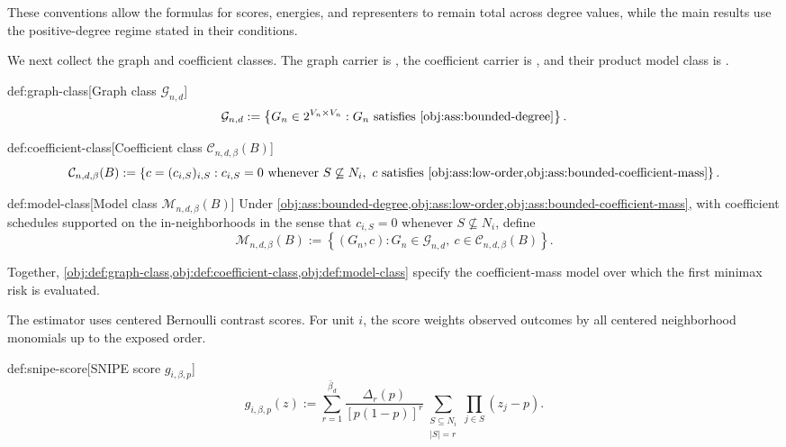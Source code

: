 These conventions allow the formulas for scores, energies, and representers to remain total across degree values, while the main results use the positive-degree regime stated in their conditions.

We next collect the graph and coefficient classes. The graph carrier is , the coefficient carrier is , and their product model class is .

\begin{definitionv}{def:graph-class}[Graph class $\mathcal G_{n,d}$]
\[
\mathcal G_{n,d}
:=
\left\{
G_n\in 2^{V_n\times V_n}:
G_n \text{ satisfies } \cref{obj:ass:bounded-degree}
\right\}.
\]
\end{definitionv}

\begin{definitionv}{def:coefficient-class}[Coefficient class $\mathcal C_{n,d,\beta}(B)$]
\[
\mathcal C_{n,d,\beta}(B)
:=
\left\{
c=(c_{i,S})_{i,S}:
c_{i,S}=0 \text{ whenever } S\not\subseteq N_i,
\ c \text{ satisfies } \cref{obj:ass:low-order,obj:ass:bounded-coefficient-mass}
\right\}.
\]
\end{definitionv}

\begin{definitionv}{def:model-class}[Model class \(\mathcal M_{n,d,\beta}(B)\)]
Under \cref{obj:ass:bounded-degree,obj:ass:low-order,obj:ass:bounded-coefficient-mass}, with coefficient schedules supported on the in-neighborhoods in the sense that \(c_{i,S}=0\) whenever \(S\not\subseteq N_i\), define
\[
\mathcal M_{n,d,\beta}(B)
:=
\left\{
(G_n,c):
G_n\in\mathcal G_{n,d},\ 
c\in\mathcal C_{n,d,\beta}(B)
\right\}.
\]
\end{definitionv}

Together, \cref{obj:def:graph-class,obj:def:coefficient-class,obj:def:model-class} specify the coefficient-mass model over which the first minimax risk is evaluated.

The estimator uses centered Bernoulli contrast scores. For unit \(i\), the score  weights observed outcomes by all centered neighborhood monomials up to the exposed order.

\begin{definitionv}{def:snipe-score}[SNIPE score $g_{i,\beta,p}$]
\[
g_{i,\beta,p}(z)
:=
\sum_{r=1}^{\bar\beta_d}
\frac{\Delta_r(p)}{[p(1-p)]^r}
\sum_{\substack{S\subseteq N_i\\ |S|=r}}
\prod_{j\in S}(z_j-p).
\]
\end{definitionv}

